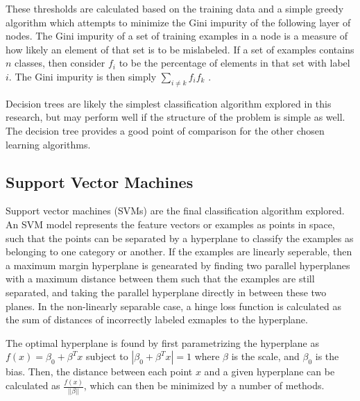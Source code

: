 These thresholds are calculated based on the training data and a simple greedy algorithm which attempts to minimize the Gini impurity of the following layer of nodes.
The Gini impurity of a set of training examples in a node is a measure of how likely an element of that set is to be mislabeled.
If a set of examples contains $n$ classes, then consider $f_i$ to be the percentage of elements in that set with label $i$.
The Gini impurity is then simply $\sum\limits_{i \not = k} f_if_k$ .

Decision trees are likely the simplest classification algorithm explored in this research, but may perform well if the structure of the problem is simple as well.
The decision tree provides a good point of comparison for the other chosen learning algorithms.




\subsection{Support Vector Machines}
Support vector machines (SVMs) are the final classification algorithm explored.
An SVM model represents the feature vectors or examples as points in space, such that the points can be separated by a hyperplane to classify the examples as belonging to one category or another.
If the examples are linearly seperable, then a maximum margin hyperplane is genearated by finding two parallel hyperplanes with a maximum distance between them such that the examples are still separated, and taking the parallel hyperplane directly in between these two planes.
In the non-linearly separable case, a hinge loss function is calculated as the sum of distances of incorrectly labeled exmaples to the hyperplane.

The optimal hyperplane is found by first parametrizing the hyperplane as $f(x) = \beta_0 + \beta^Tx$ subject to $|\beta_0 + \beta^Tx| =1$ where $\beta$ is the scale, and $\beta_0$ is the bias.
Then, the distance between each point $x$ and a given hyperplane can be calculated as $\frac{f(x)}{||\beta||}$, which can then be minimized by a number of methods.



